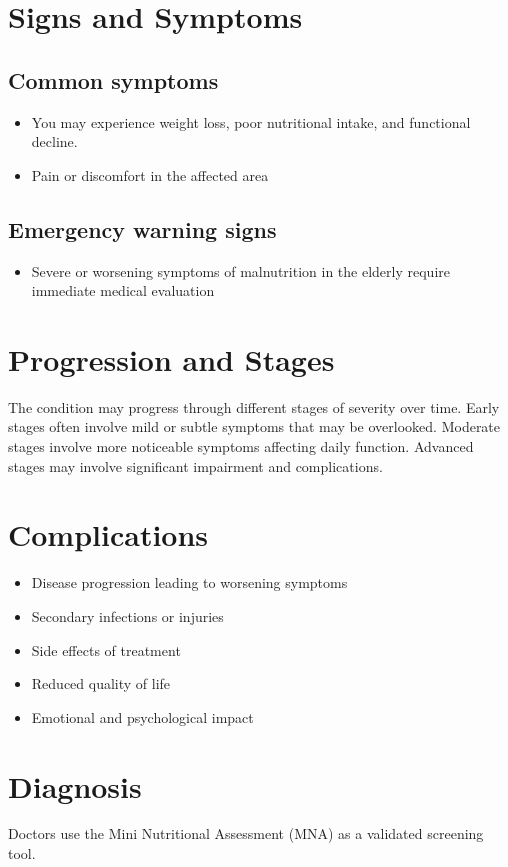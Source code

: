 \section{Signs and Symptoms}

\subsection{Common symptoms}
\begin{itemize}[noitemsep]
  \item You may experience weight loss, poor nutritional intake, and functional decline.
  \item Pain or discomfort in the affected area
  \end{itemize}

\subsection{Emergency warning signs}
\begin{itemize}[noitemsep]
  \item Severe or worsening symptoms of malnutrition in the elderly require immediate medical evaluation
\end{itemize}
\section{Progression and Stages}
The condition may progress through different stages of severity over time. Early stages often involve mild or subtle symptoms that may be overlooked. Moderate stages involve more noticeable symptoms affecting daily function. Advanced stages may involve significant impairment and complications.
\section{Complications}
\begin{itemize}[noitemsep]
  \item Disease progression leading to worsening symptoms
  \item Secondary infections or injuries
  \item Side effects of treatment
  \item Reduced quality of life
  \item Emotional and psychological impact
\end{itemize}
\section{Diagnosis}
Doctors use the Mini Nutritional Assessment (MNA) as a validated screening tool.

